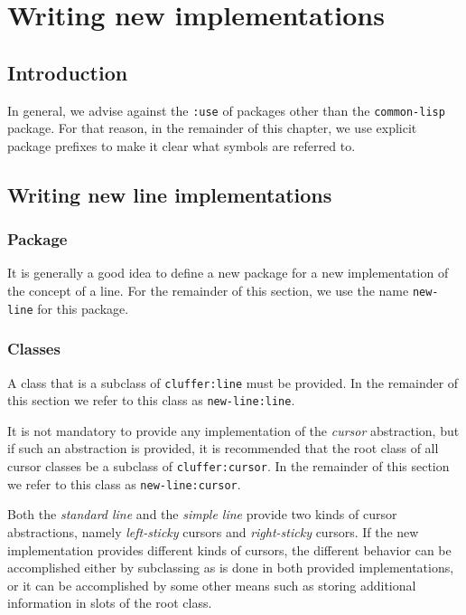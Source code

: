 \chapter{Writing new implementations}

\section{Introduction}

In general, we advise against the \texttt{:use} of packages other than
the \texttt{common-lisp} package.  For that reason, in the remainder
of this chapter, we use explicit package prefixes to make it clear
what symbols are referred to.

\section{Writing new line implementations}

\subsection{Package}

It is generally a good idea to define a new package for a new
implementation of the concept of a line.  For the remainder of this
section, we use the name \texttt{new-line} for this package.

\subsection{Classes}

A class that is a subclass of \texttt{cluffer:line} must be provided.
In the remainder of this section we refer to this class as
\texttt{new-line:line}.

It is not mandatory to provide any implementation of the \emph{cursor}
abstraction, but if such an abstraction is provided, it is recommended
that the root class of all cursor classes be a subclass of
\texttt{cluffer:cursor}.  In the remainder of this section we refer to
this class as \texttt{new-line:cursor}.

Both the \emph{standard line}
 and the \emph{simple line}
 provide two kinds of cursor
abstractions, namely \emph{left-sticky} cursors and
\emph{right-sticky} cursors.  If the new implementation provides
different kinds of cursors, the different behavior can be accomplished
either by subclassing as is done in both provided implementations, or
it can be accomplished by some other means such as storing additional
information in slots of the root class.

